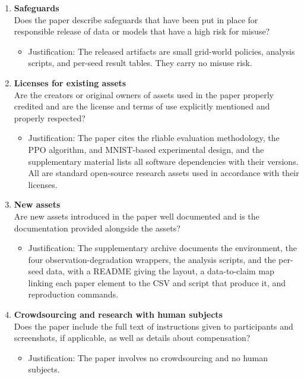 \begin{enumerate}
\item {\bf Safeguards}\\
Does the paper describe safeguards that have been put in place for responsible release of data
or models that have a high risk for misuse?
\answerNA{}
\begin{itemize}
\item[] Justification: The released artifacts are small grid-world policies, analysis scripts,
  and per-seed result tables. They carry no misuse risk.
\end{itemize}

\item {\bf Licenses for existing assets}\\
Are the creators or original owners of assets used in the paper properly credited and are the
license and terms of use explicitly mentioned and properly respected?
\answerYes{}
\begin{itemize}
\item[] Justification: The paper cites the rliable evaluation methodology, the PPO algorithm,
  and MNIST-based experimental design, and the supplementary material lists all software
  dependencies with their versions. All are standard open-source research assets used in
  accordance with their licenses.
\end{itemize}

\item {\bf New assets}\\
Are new assets introduced in the paper well documented and is the documentation provided
alongside the assets?
\answerYes{}
\begin{itemize}
\item[] Justification: The supplementary archive documents the environment, the four
  observation-degradation wrappers, the analysis scripts, and the per-seed data, with a README
  giving the layout, a data-to-claim map linking each paper element to the CSV and script that
  produce it, and reproduction commands.
\end{itemize}

\item {\bf Crowdsourcing and research with human subjects}\\
Does the paper include the full text of instructions given to participants and screenshots, if
applicable, as well as details about compensation?
\answerNA{}
\begin{itemize}
\item[] Justification: The paper involves no crowdsourcing and no human subjects.
\end{itemize}


\end{enumerate}
